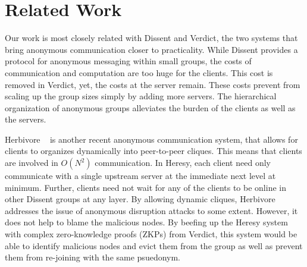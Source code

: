 \section{Related Work}
\label{sec:related}
Our work is most closely related with Dissent and Verdict, the two systems that bring anonymous communication closer to practicality. While Dissent provides a protocol for anonymous messaging within small groups, the costs of communication and computation are too huge for the clients. This cost is removed in Verdict, yet, the costs at the server remain. These costs prevent from scaling up the group sizes simply by adding more servers. The hierarchical organization of anonymous groups alleviates the burden of the clients as well as the servers.


Herbivore ~\cite{herbivore:tr} is another recent anonymous communication system, that allows for clients to organizes dynamically into peer-to-peer cliques. This means that clients are involved in $O(N^2)$ communication. In Heresy, each client need only communicate with a single upstream server at the immediate next level at minimum. Further, clients need not wait for any of the clients to be online in other Dissent groups at any layer. By allowing dynamic cliques, Herbivore addresses the issue of anonymous disruption attacks to some extent. However, it does not help to blame the malicious nodes. By beefing up the Heresy system with complex zero-knowledge proofs (ZKPs) from Verdict, this system would be able to identify malicious nodes and evict them from the group as well as prevent them from re-joining with the same psuedonym.

